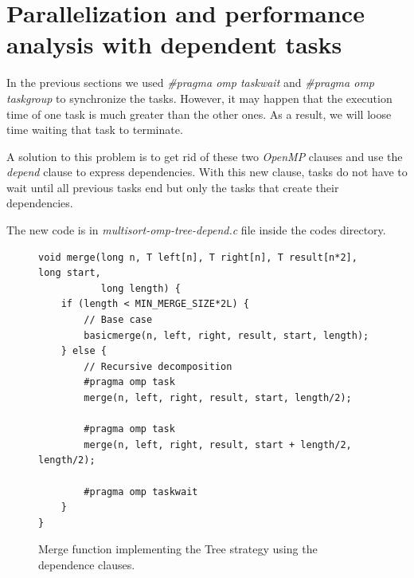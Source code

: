\documentclass[12pt, a4paper]{article}
\begin{document}
\section{Parallelization and performance analysis with dependent tasks}

In the previous sections we used \textit{\#pragma omp taskwait} and \textit{\#pragma omp taskgroup} to synchronize the tasks. However, it may happen that the execution time of one task is much greater than the other ones. As a result, we will loose time waiting that task to terminate.

A solution to this problem is to get rid of these two \textit{OpenMP} clauses and use the \textit{depend} clause to express dependencies. With this new clause, tasks do not have to wait until all previous tasks end but only the tasks that create their dependencies.

The new code is in \textit{multisort-omp-tree-depend.c} file inside the codes directory.

\begin{figure}[H]
\begin{lstlisting}
void merge(long n, T left[n], T right[n], T result[n*2], long start,
		   long length) {
    if (length < MIN_MERGE_SIZE*2L) {
        // Base case
        basicmerge(n, left, right, result, start, length);
    } else {
        // Recursive decomposition
        #pragma omp task
        merge(n, left, right, result, start, length/2);
        
        #pragma omp task
        merge(n, left, right, result, start + length/2, length/2);
        
        #pragma omp taskwait
    }
}
\end{lstlisting}

\caption{Merge function implementing the Tree strategy using the dependence clauses.}
\end{figure}
\end{document}

